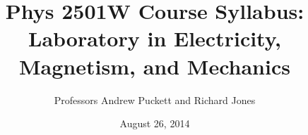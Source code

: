 \documentclass{revtex4}
\begin{document}

\title{Phys 2501W Course Syllabus: Laboratory in Electricity, Magnetism, and Mechanics}


\author{Professors Andrew Puckett and Richard Jones}


\date{August 26, 2014}


\setlength{\topmargin}{0in}

\maketitle

\end{document}
